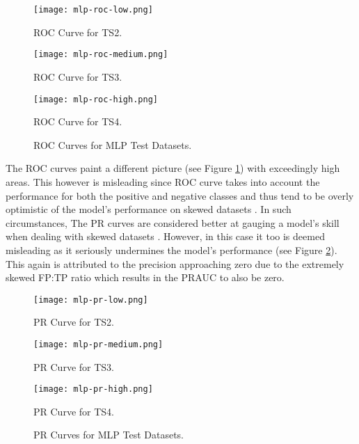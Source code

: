 \begin{figure}[htb]
  \centering
  \begin{minipage}{0.32\textwidth}
    \centering
    \texttt{[image: mlp-roc-low.png]}
    \caption{ROC Curve for TS2.}
  \end{minipage}
  \begin{minipage}{0.32\textwidth}
    \centering
    \texttt{[image: mlp-roc-medium.png]}
    \caption{ROC Curve for TS3.}
  \end{minipage}
  \begin{minipage}{0.32\textwidth}
    \centering
    \texttt{[image: mlp-roc-high.png]}
    \caption{ROC Curve for TS4.}
  \end{minipage}
  \caption{ROC Curves for MLP Test Datasets.}
  \label{fig:mlp-roc}
\end{figure}

The ROC curves paint a different picture (see Figure
\ref{fig:mlp-roc}) with exceedingly high areas. This however is
misleading since ROC curve takes into account the performance for both
the positive and negative classes and thus tend to be overly
optimistic of the model's performance on skewed datasets
\cite{branco2015survey,fernandez2018learning}. In such circumstances,
The PR curves are considered better at gauging a model's skill when
dealing with skewed datasets \cite{branco2015survey}. However, in this
case it too is deemed misleading as it seriously undermines the
model's performance (see Figure \ref{fig:mlp-pr}). This again is
attributed to the precision approaching zero due to the extremely
skewed FP:TP ratio which results in the PRAUC to also be zero.

\begin{figure}[htb]
  \centering
  \begin{minipage}{0.32\textwidth}
    \centering
    \texttt{[image: mlp-pr-low.png]}
    \caption{PR Curve for TS2.}
  \end{minipage}
  \begin{minipage}{0.32\textwidth}
    \centering
    \texttt{[image: mlp-pr-medium.png]}
    \caption{PR Curve for TS3.}
  \end{minipage}
  \begin{minipage}{0.32\textwidth}
    \centering
    \texttt{[image: mlp-pr-high.png]}
    \caption{PR Curve for TS4.}
  \end{minipage}
  \caption{PR Curves for MLP Test Datasets.}
  \label{fig:mlp-pr}
\end{figure}

